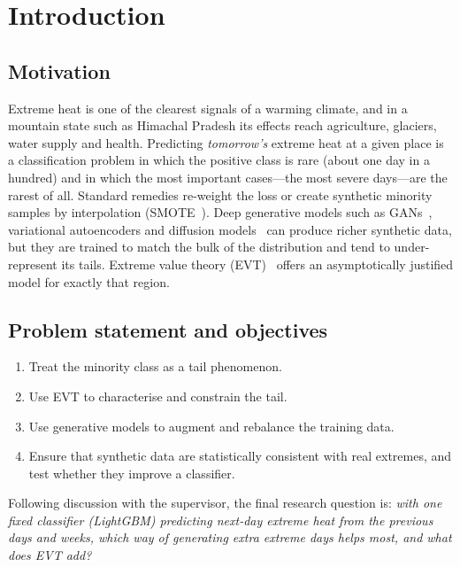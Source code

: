 \documentclass[11pt,a4paper]{article}
\begin{document}
\tableofcontents
\newpage

\section{Introduction}
\subsection{Motivation}
Extreme heat is one of the clearest signals of a warming climate, and in a mountain state such as
Himachal Pradesh its effects reach agriculture, glaciers, water supply and health. Predicting
\emph{tomorrow's} extreme heat at a given place is a classification problem in which the positive class is
rare (about one day in a hundred) and in which the most important cases---the most severe days---are the
rarest of all. Standard remedies re-weight the loss or create synthetic minority samples by interpolation
(SMOTE~\cite{chawla2002smote}). Deep generative models such as GANs~\cite{goodfellow2014gan,xu2019ctgan},
variational autoencoders and diffusion models~\cite{ho2020ddpm,kotelnikov2023tabddpm} can produce richer
synthetic data, but they are trained to match the bulk of the distribution and tend to under-represent its
tails. Extreme value theory (EVT)~\cite{coles2001} offers an asymptotically justified model for exactly
that region.

\subsection{Problem statement and objectives}
\begin{enumerate}
  \item Treat the minority class as a tail phenomenon.
  \item Use EVT to characterise and constrain the tail.
  \item Use generative models to augment and rebalance the training data.
  \item Ensure that synthetic data are statistically consistent with real extremes, and test whether they
        improve a classifier.
\end{enumerate}
Following discussion with the supervisor, the final research question is: \emph{with one fixed classifier
(LightGBM) predicting next-day extreme heat from the previous days and weeks, which way of generating extra
extreme days helps most, and what does EVT add?}
\end{document}
